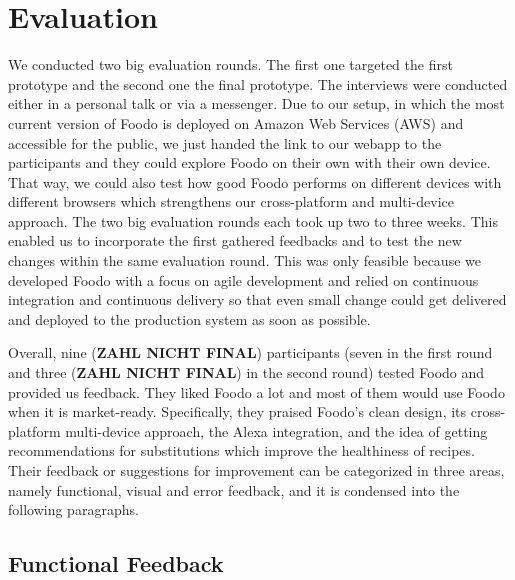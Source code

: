 \chapter{Evaluation}
We conducted two big evaluation rounds. The first one targeted the first prototype and the second one the final prototype. The interviews were conducted either in a personal talk or via a messenger. Due to our setup, in which the most current version of Foodo is deployed on Amazon Web Services (AWS) and accessible for the public, we just handed the link to our webapp to the participants and they could explore Foodo on their own with their own device. That way, we could also test how good Foodo performs on different devices with different browsers which strengthens our cross-platform and multi-device approach. The two big evaluation rounds each took up two to three weeks. This enabled us to incorporate the first gathered feedbacks and to test the new changes within the same evaluation round. This was only feasible because we developed Foodo with a focus on agile development and relied on continuous integration and continuous delivery so that even small change could get delivered and deployed to the production system as soon as possible. 

Overall, nine (\textbf{ZAHL NICHT FINAL}) participants (seven in the first round and three (\textbf{ZAHL NICHT FINAL}) in the second round) tested Foodo and provided us feedback. They liked Foodo a lot and most of them would use Foodo when it is market-ready. Specifically, they praised Foodo's clean design, its cross-platform multi-device approach, the Alexa integration, and the idea of getting recommendations for substitutions which improve the healthiness of recipes. Their feedback or suggestions for improvement can be categorized in three areas, namely functional, visual and error feedback, and it is condensed into the following paragraphs.

\section{Functional Feedback}


